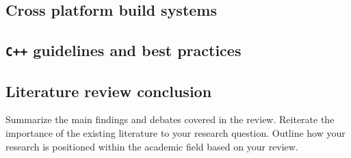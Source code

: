 \subsection{Cross platform build systems}

\subsection{\texttt{C++} guidelines and best practices}

\subsection{Literature review conclusion}
Summarize the main findings and debates covered in the review.
Reiterate the importance of the existing literature to your research question.
Outline how your research is positioned within the academic field based on your review.

